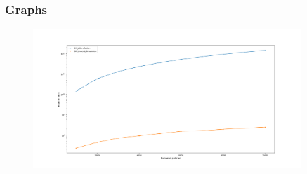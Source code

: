 \begin{frame}
    \frametitle{Graphs}
    \begin{figure}
        \label{fig:timelclog}
        \includegraphics[width=0.9\textwidth]{../../res/lj_big_plot_log}
    \end{figure}
\end{frame}
